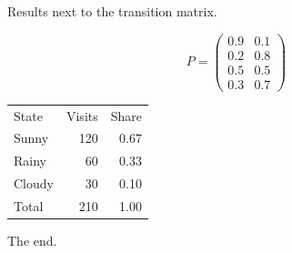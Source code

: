 \documentclass{article}
\begin{document}
Results next to the transition matrix.

\noindent\begin{minipage}{0.45\textwidth}
\[ P = \begin{pmatrix} 0.9 & 0.1 \\ 0.2 & 0.8 \\ 0.5 & 0.5 \\ 0.3 & 0.7\end{pmatrix} \]
\end{minipage}\hfill
\begin{minipage}{0.5\textwidth}
\begin{tabular}{lrr}
State & Visits & Share \\
Sunny & 120 & 0.67 \\
Rainy & 60 & 0.33 \\
Cloudy & 30 & 0.10 \\
Total & 210 & 1.00 \\
\end{tabular}
\end{minipage}

The end.
\end{document}

